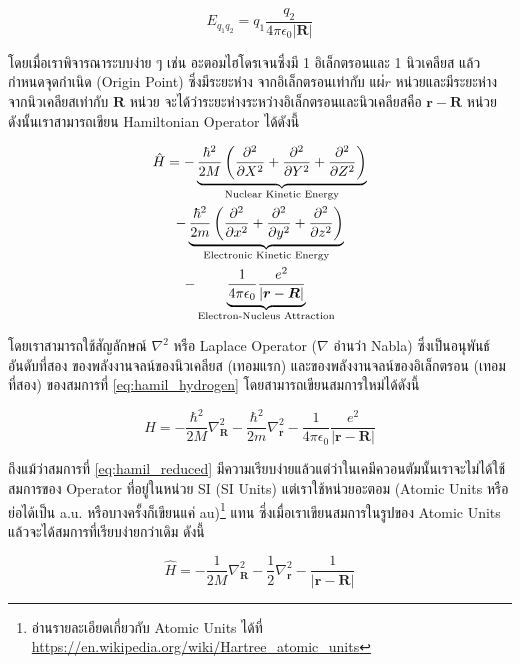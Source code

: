 \begin{equation}
    E_{q_{1}q_{2}} = q_{1}\frac{q_{2}}{4\pi\epsilon_{0}|\bm{R}|}
\end{equation}

โดยเมื่อเราพิจารณาระบบง่าย ๆ เช่น อะตอมไฮโดรเจนซึ่งมี 1 อิเล็กตรอนและ 1 นิวเคลียส แล้วกำหนดจุดกำเนิด (Origin Point) ซึ่งมีระยะห่าง%
จากอิเล็กตรอนเท่ากับ $แผ่{r}$ หน่วยและมีระยะห่างจากนิวเคลียสเท่ากับ $\bm{R}$ หน่วย จะได้ว่าระยะห่างระหว่างอิเล็กตรอนและนิวเคลียสคือ 
$\bm{r}-\bm{R}$ หน่วย ดังนั้นเราสามารถเขียน Hamiltonian Operator ได้ดังนี้

\begin{multline}\label{eq:hamil_hydrogen}
    \hat{H} = -\underbrace{\frac{\hbar^{2}}{2M} \left( \pdv[2]{X} + \pdv[2]{Y} + \pdv[2]{Z} \right)}_{%
                \text{Nuclear Kinetic Energy}} 
              \\
              -\underbrace{\frac{\hbar^{2}}{2m} \left( \pdv[2]{x} + \pdv[2]{y} + \pdv[2]{z} \right)}_{%
                \text{Electronic Kinetic Energy}}
              \\
              -\underbrace{\frac{1}{4\pi\epsilon_{0}}\frac{e^{2}}{|\bm{r}-\bm{R}|}}_{%
                \text{Electron-Nucleus Attraction}}
\end{multline}

\noindent โดยเราสามารถใช้สัญลักษณ์ $\nabla^{2}$ หรือ Laplace Operator ($\nabla$ อ่านว่า Nabla) ซึ่งเป็นอนุพันธ์อันดับที่สอง%
ของพลังงานจลน์ของนิวเคลียส (เทอมแรก) และของพลังงานจลน์ของอิเล็กตรอน (เทอมที่สอง) ของสมการที่ \ref{eq:hamil_hydrogen} 
โดยสามารถเขียนสมการใหม่ได้ดังนี้

\begin{equation}\label{eq:hamil_reduced}
    \hat{H} = -\frac{\hbar^{2}}{2M} \nabla^{2}_{\bm{R}} - \frac{\hbar^{2}}{2m} \nabla^{2}_{\bm{r}}
              -\frac{1}{4\pi\epsilon_{0}}\frac{e^{2}}{|\bm{r}-\bm{R}|}
\end{equation}

ถึงแม้ว่าสมการที่ \ref{eq:hamil_reduced} มีความเรียบง่ายแล้วแต่ว่าในเคมีควอนตัมนั้นเราจะไม่ได้ใช้สมการของ Operator ที่อยู่ในหน่วย
SI (SI Units) แต่เราใช้หน่วยอะตอม (Atomic Units หรือย่อได้เป็น a.u. หรือบางครั้งก็เขียนแค่ au)\footnote{อ่านรายละเอียดเกี่ยวกับ
Atomic Units ได้ที่ \url{https://en.wikipedia.org/wiki/Hartree_atomic_units}} แทน ซึ่งเมื่อเราเขียนสมการในรูปของ 
Atomic Units แล้วจะได้สมการที่เรียบง่ายกว่าเดิม ดังนี้

\begin{equation}\label{eq:hamil_au}
    \hat{H} = -\frac{1}{2M} \nabla^{2}_{\bm{R}} 
              -\frac{1}{2} \nabla^{2}_{\bm{r}}
              -\frac{1}{|\bm{r}-\bm{R}|}
\end{equation}

